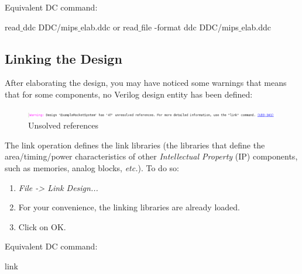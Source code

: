 Equivalent DC command: 
	\begin{codeline}
read$\_$ddc DDC/mips$\_$elab.ddc \newline
or \newline
read$\_$file -format ddc DDC/mips$\_$elab.ddc
\end{codeline}

\subsection{Linking the Design}

After elaborating the design, you may have noticed some warnings that means that for some components, no Verilog design entity has been defined:
\begin{figure}[!h]
	\centering
	\includegraphics[scale=0.46]{figures/lab3_design_compiler/references}
	\caption{Unsolved references}
	\label{fig_references}
\end{figure}

The link operation defines the link libraries (the libraries that define the area/timing/power characteristics of other \textit{Intellectual Property} (IP) components, such as memories, analog blocks, \textit{etc.}). To do so: 
\begin{enumerate}
	\item \textit {File -> Link Design...}
	\item For your convenience, the linking libraries are already loaded.
	\item Click on OK.
\end{enumerate}
Equivalent DC command:
	\begin{codeline}
	link
\end{codeline}


